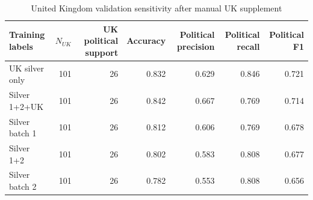 \begin{table}[htbp]
\centering
\small
\caption{United Kingdom validation sensitivity after manual UK supplement}
\label{tab:pc-classifier-uk-sensitivity}
\begin{tabular}{lrrrrrr}
\toprule
Training labels & $N_{UK}$ & UK political support & Accuracy & Political precision & Political recall & Political F1 \\
\midrule
UK silver only & 101 & 26 & 0.832 & 0.629 & 0.846 & 0.721 \\
Silver 1+2+UK & 101 & 26 & 0.842 & 0.667 & 0.769 & 0.714 \\
Silver batch 1 & 101 & 26 & 0.812 & 0.606 & 0.769 & 0.678 \\
Silver 1+2 & 101 & 26 & 0.802 & 0.583 & 0.808 & 0.677 \\
Silver batch 2 & 101 & 26 & 0.782 & 0.553 & 0.808 & 0.656 \\
\bottomrule
\end{tabular}
\end{table}
